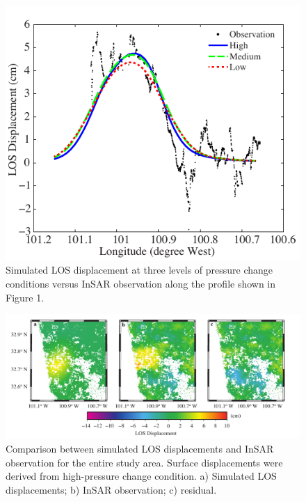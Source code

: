 \clearpage
\begin{figure}
	\centering
	\includegraphics{figs_paper3/Fig10.pdf}	
	\caption{Simulated LOS displacement at three levels of pressure change conditions versus InSAR observation along the profile shown in Figure 1.}
	\label{fig:1d_compare}
\end{figure}

\clearpage
\begin{figure}
	\centering
	\includegraphics[width=\textwidth]{figs_paper3/Fig11.pdf}	
	\caption{Comparison between simulated LOS displacements and InSAR observation for the entire study area.  Surface displacements were derived from high-pressure change condition.  a) Simulated LOS displacements; b) InSAR observation; c) residual.}
	\label{fig:2d_compare}
\end{figure}
% 
